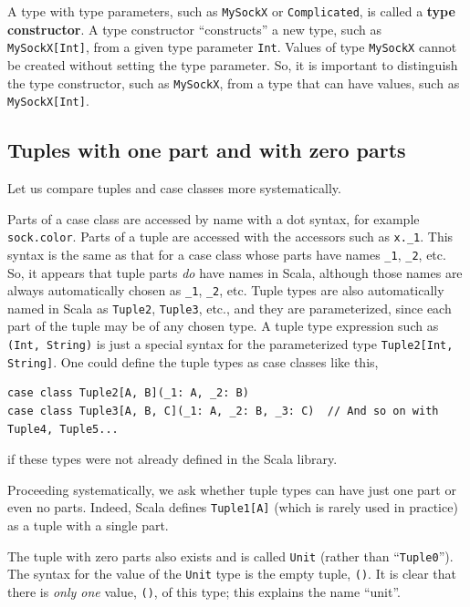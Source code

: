 A type with type parameters, such as \lstinline!MySockX! or \lstinline!Complicated!,
is called a \textbf{type constructor}. A
type constructor \textsf{``}constructs\textsf{''} a new type, such as \lstinline!MySockX[Int]!,
from a given type parameter \lstinline!Int!. Values of type \lstinline!MySockX!
cannot be created without setting the type parameter. So, it is important
to distinguish the type constructor, such as \lstinline!MySockX!,
from a type that can have values, such as \lstinline!MySockX[Int]!.

\subsection{Tuples with one part and with zero parts}

Let us compare tuples and case classes more systematically.

Parts of a case class are accessed by name with a dot syntax, for
example \lstinline!sock.color!. Parts of a tuple are accessed with
the accessors such as \lstinline!x._1!. This syntax is the same as
that for a case class whose parts have names \lstinline!_1!, \lstinline!_2!,
etc. So, it appears that tuple parts \emph{do} have names in Scala,
although those names are always automatically chosen as \lstinline!_1!,
\lstinline!_2!, etc. Tuple types are also automatically named in
Scala as \lstinline!Tuple2!, \lstinline!Tuple3!, etc., and they
are parameterized, since each part of the tuple may be of any chosen
type. A tuple type expression such as \lstinline!(Int, String)! is
just a special syntax for the parameterized type \lstinline!Tuple2[Int, String]!.
One could define the tuple types as case classes like this,
\begin{lstlisting}
case class Tuple2[A, B](_1: A, _2: B)
case class Tuple3[A, B, C](_1: A, _2: B, _3: C)  // And so on with Tuple4, Tuple5...
\end{lstlisting}
if these types were not already defined in the Scala library.

Proceeding systematically, we ask whether tuple types can have just
one part or even no parts. Indeed, Scala defines \lstinline!Tuple1[A]!
(which is rarely used in practice) as a tuple with a single part.

The tuple with zero parts also exists and is called \lstinline!Unit!
(rather than \textsf{``}\lstinline!Tuple0!\textsf{''}). The syntax for the value
of the \lstinline!Unit! type is the empty tuple, \lstinline!()!.
It is clear that there is \emph{only one} value, \lstinline!()!,
of this type; this explains the name \textsf{``}unit\textsf{''}. 

